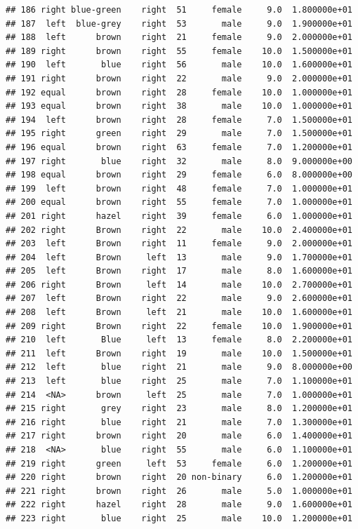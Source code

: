 \documentclass[]{article}
\begin{document}
\begin{verbatim}
## 186 right blue-green    right  51     female     9.0  1.800000e+01
## 187  left  blue-grey    right  53       male     9.0  1.900000e+01
## 188  left      brown    right  21     female     9.0  2.000000e+01
## 189 right      brown    right  55     female    10.0  1.500000e+01
## 190  left       blue    right  56       male    10.0  1.600000e+01
## 191 right      brown    right  22       male     9.0  2.000000e+01
## 192 equal      brown    right  28     female    10.0  1.000000e+01
## 193 equal      brown    right  38       male    10.0  1.000000e+01
## 194  left      brown    right  28     female     7.0  1.500000e+01
## 195 right      green    right  29       male     7.0  1.500000e+01
## 196 equal      brown    right  63     female     7.0  1.200000e+01
## 197 right       blue    right  32       male     8.0  9.000000e+00
## 198 equal      brown    right  29     female     6.0  8.000000e+00
## 199  left      brown    right  48     female     7.0  1.000000e+01
## 200 equal      brown    right  55     female     7.0  1.000000e+01
## 201 right      hazel    right  39     female     6.0  1.000000e+01
## 202 right      Brown    right  22       male    10.0  2.400000e+01
## 203  left      Brown    right  11     female     9.0  2.000000e+01
## 204  left      Brown     left  13       male     9.0  1.700000e+01
## 205  left      Brown    right  17       male     8.0  1.600000e+01
## 206 right      Brown     left  14       male    10.0  2.700000e+01
## 207  left      Brown    right  22       male     9.0  2.600000e+01
## 208  left      Brown     left  21       male    10.0  1.600000e+01
## 209 right      Brown    right  22     female    10.0  1.900000e+01
## 210  left       Blue     left  13     female     8.0  2.200000e+01
## 211  left      Brown    right  19       male    10.0  1.500000e+01
## 212  left       blue    right  21       male     9.0  8.000000e+00
## 213  left       blue    right  25       male     7.0  1.100000e+01
## 214  <NA>      brown     left  25       male     7.0  1.000000e+01
## 215 right       grey    right  23       male     8.0  1.200000e+01
## 216 right       blue    right  21       male     7.0  1.300000e+01
## 217 right      brown    right  20       male     6.0  1.400000e+01
## 218  <NA>       blue    right  55       male     6.0  1.100000e+01
## 219 right      green     left  53     female     6.0  1.200000e+01
## 220 right      brown    right  20 non-binary     6.0  1.200000e+01
## 221 right      brown    right  26       male     5.0  1.000000e+01
## 222 right      hazel    right  28       male     9.0  1.600000e+01
## 223 right       blue    right  25       male    10.0  1.200000e+01

\end{verbatim}
\end{document}
